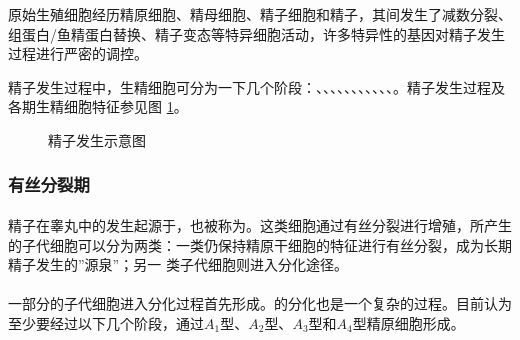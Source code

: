 原始生殖细胞经历精原细胞、精母细胞、精子细胞和精子，其间发生了减数分裂、组蛋白/鱼精蛋白替换、精子变态等特异细胞活动，许多特异性的基因对精子发生过程进行严密的调控。

精子发生过程中，生精细胞可分为一下几个阶段：、、、、、、、、、、、。精子发生过程及各期生精细胞特征参见图 \ref{figure_spermatogenesis_process}。

\begin{figure}
\centering
\myFigurePlaceholder
\caption{精子发生示意图}
\label{figure_spermatogenesis_process}
\end{figure}

\subsubsection{有丝分裂期}

\paragraph{}

精子在睾丸中的发生起源于，也被称为。这类细胞通过有丝分裂进行增殖，所产生的子代细胞可以分为两类：一类仍保持精原干细胞的特征进行有丝分裂，成为长期精子发生的”源泉”；另一 类子代细胞则进入分化途径。

\paragraph{}

一部分的子代细胞进入分化过程首先形成。的分化也是一个复杂的过程。目前认为至少要经过以下几个阶段，通过$ A_1 $型、$ A_2 $型、$ A_3 $型和$ A_4 $型精原细胞形成。

\paragraph{}

